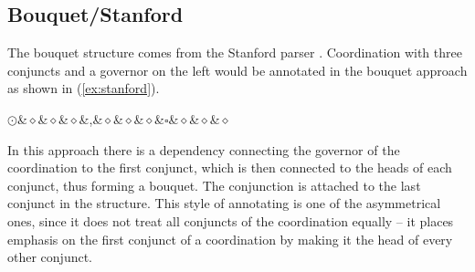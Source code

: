 \subsection{Bouquet/Stanford}
The bouquet structure comes from the Stanford parser \citep{de-marneffe-etal-2006-generating}. Coordination with three conjuncts and a governor on the left would be annotated in the bouquet approach as shown in (\ref{ex:stanford}).

\begin{exe}
\centering
\ex\label{ex:stanford}
\begin{dependency}[theme = simple, baseline=-\the\dimexpr\fontdimen22\textfont2\relax]
        \begin{deptext}
        $\odot$\&$\diamond$\&$\diamond$\&$\diamond$\&,\&$\diamond$\&$\diamond$\&$\diamond$\&$\square$\&$\diamond$\&$\diamond$\&$\diamond$\\
            \end{deptext}
        \end{dependency}
\end{exe}

In this approach there is a dependency connecting the governor of the coordination to the first conjunct, which is then connected to the heads of each conjunct, thus forming a bouquet. The conjunction is attached to the last conjunct in the structure. This style of annotating is one of the asymmetrical ones, since it does not treat all conjuncts of the coordination equally -- it places emphasis on the first conjunct of a coordination by making it the head of every other conjunct. 

\vspace{-0.5\treeheight}

